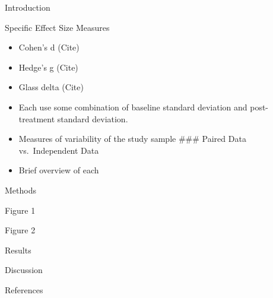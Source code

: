 \documentclass[
  ignorenonframetext,
  aspectratio=169,
]{beamer}
\providecommand{\tightlist}{%
  \setlength{\itemsep}{0pt}\setlength{\parskip}{0pt}}
\begin{document}
\begin{frame}{Introduction}
\protect\hypertarget{introduction}{}
\begin{block}{Specific Effect Size Measures}
\protect\hypertarget{specific-effect-size-measures}{}
\begin{itemize}
\tightlist
\item
  Cohen's d (Cite)
\item
  Hedge's g (Cite)
\item
  Glass delta (Cite)
\item
  Each use some combination of baseline standard deviation and
  post-treatment standard deviation.
\item
  Measures of variability of the study sample \#\#\# Paired Data
  vs.~Independent Data
\item
  Brief overview of each
\end{itemize}
\end{block}
\end{frame}

\begin{frame}{Methods}
\protect\hypertarget{methods}{}
\end{frame}

\begin{frame}{Figure 1}
\protect\hypertarget{figure-1}{}
\end{frame}

\begin{frame}{Figure 2}
\protect\hypertarget{figure-2}{}
\end{frame}

\begin{frame}{Results}
\protect\hypertarget{results}{}
\end{frame}

\begin{frame}{Discussion}
\protect\hypertarget{discussion}{}
\end{frame}

\begin{frame}{References}
\protect\hypertarget{references}{}
\end{frame}
\end{document}
